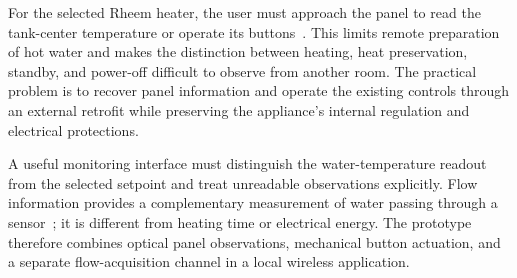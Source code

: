 For the selected Rheem heater, the user must approach the panel to read the tank-center temperature or operate its buttons~\cite{rheemmanual}. This limits remote preparation of hot water and makes the distinction between heating, heat preservation, standby, and power-off difficult to observe from another room. The practical problem is to recover panel information and operate the existing controls through an external retrofit while preserving the appliance's internal regulation and electrical protections.

A useful monitoring interface must distinguish the water-temperature readout from the selected setpoint and treat unreadable observations explicitly. Flow information provides a complementary measurement of water passing through a sensor~\cite{lee2021}; it is different from heating time or electrical energy. The prototype therefore combines optical panel observations, mechanical button actuation, and a separate flow-acquisition channel in a local wireless application.
